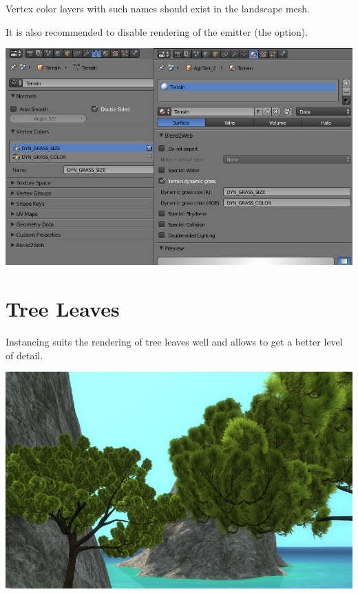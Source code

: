 \documentclass[a4paper,12pt,oneside]{sphinxmanual}
\begin{document}
Vertex color layers with such names should exist in the landscape mesh.

It is also recommended to disable rendering of the emitter (the  option).

{\hfill\includegraphics[width=1.000\linewidth]{dynamic_grass_setup.jpg}\hfill}


\section{Tree Leaves}
\label{particles_instancing:particles-leaves}\label{particles_instancing:id4}
Instancing suits the rendering of tree leaves well and allows to get a better level of detail.

{\hfill\includegraphics[width=1.000\linewidth]{tree_leaves.jpg}\hfill}

\begin{DUlineblock}{0em}
\item[] 
\end{DUlineblock}
\end{document}
